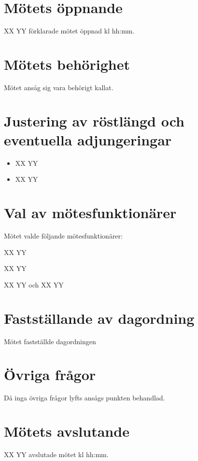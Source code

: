 \documentclass[a4paper,10pt]{article}
\title{}
\date{\today}
\author{}
\begin{document}
\maketitle
\section{Mötets öppnande}
XX YY förklarade mötet öppnad kl hh:mm.

\section{Mötets behörighet}
Mötet ansåg sig vara behörigt kallat.

\section{Justering av röstlängd och eventuella adjungeringar}
\begin{itemize}[noitemsep]
	\item XX YY
	\item XX YY
\end{itemize}

\section{Val av mötesfunktionärer}
Mötet valde följande mötesfunktionärer:
\begin{description}[noitemsep]
	\item[Mötesordförande:] XX YY
	\item[Mötessekreterare:] XX YY
	\item[Justerare av protokollet:] XX YY och XX YY
\end{description}

\section{Fastställande av dagordning}
Mötet fastställde dagordningen %


\section{Övriga frågor}
Då inga övriga frågor lyfts ansågs punkten behandlad.

\section{Mötets avslutande}
XX YY avslutade mötet kl hh:mm.
\end{document}
